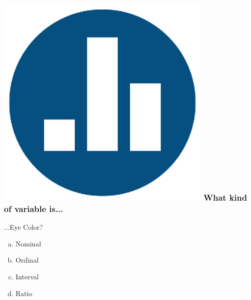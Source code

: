 \documentclass[handout]{beamer}
\begin{document}
\begin{frame}
\frametitle{\includegraphics[scale = 0.05]{./images/clicker} \hfill What kind of variable is...}
...Eye Color?
	\begin{enumerate}[(a)]
\item Nominal
\item Ordinal
\item Interval
\item Ratio
\end{enumerate}
\end{frame}
\end{document}
